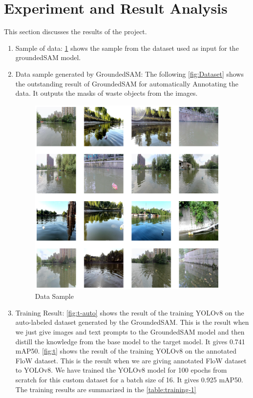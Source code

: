 \section{Experiment and Result Analysis}
This section discusses the results of the project.
\begin{enumerate}
\item Sample of data:
\ref{fig:Data} shows the sample from the dataset used as input for the groundedSAM model.

\item Data sample generated by GroundedSAM:
The following \ref{fig:Dataset} shows the outstanding result of GroundedSAM for automatically Annotating the data. It outputs the masks of waste objects from the images.

\begin{figure}[H]
\centering
	\includegraphics*[height=10cm, width = 10cm]{images/Data-Sample.png}
	 \caption{Data Sample}
	\label{fig:Data}
\end{figure}

 \item Training Result:
\ref{fig:t-auto} shows the result of the training YOLOv8 on the auto-labeled dataset generated by the GroundedSAM. This is the result when we just give images and text prompts to the GroundedSAM model and then distill the knowledge from the base model to the target model. It gives 0.741 mAP50. 
\ref{fig:t} shows the result of the training YOLOv8 on the annotated FloW dataset. This is the result when we are giving annotated FloW dataset to YOLOv8. We have trained the YOLOv8 model for 100 epochs from scratch for this custom dataset for a batch size of 16. It gives 0.925 mAP50.
The training results are summarized in the \ref{table:training-1}
\newline


\end{enumerate}
